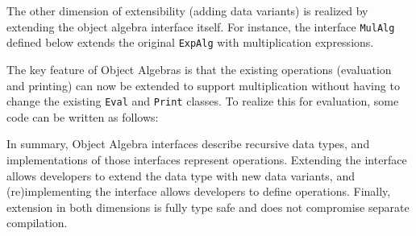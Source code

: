 The other dimension of extensibility (adding data variants) is  realized by extending the object algebra interface itself. For instance,
the interface \lstinline{MulAlg} defined below extends the original \lstinline{ExpAlg} with multiplication expressions.


The key feature of Object Algebras is that the existing operations (evaluation and printing) can now be extended to support multiplication without having to change the existing \lstinline{Eval} and \lstinline{Print} classes. To realize this for evaluation, some code can be written as follows:


In summary, Object Algebra interfaces  describe recursive data types, and implementations of those interfaces represent operations. Extending the interface allows developers to extend the data type with new data variants, and (re)implementing the interface allows developers to define operations.
Finally, extension in both dimensions is fully type safe and does not compromise separate compilation.


\begin{comment}

This paper showed how various types of traversals for complex
structures can be automatically provided by \Name. \name traversals are
written directly in Java and are type-safe, extensible and separately
compilable. There has always been a tension between the
correctness guarantees of static typing, and the flexibility of
untyped/dynamically-typed approaches. \name shows that even
in type systems like Java's, it is possible to get considerable
flexibility and adaptability for the problem of boilerplate code in
traversals of complex structures, without giving up modular static typing.

There are many of avenues for future work. One area of research is to
extend \name traversals to support flexible traversal strategies,
similarly to strategic
programming~\cite{borovansky1996elan,visser1998core,vandenBrand:2003:TRT:941566.941568}. Another
line of work worth exploring is to adopt generalizations of object
algebras~\cite{oliveira13fop} for added expressiveness of \name
traversals.

\end{comment}
